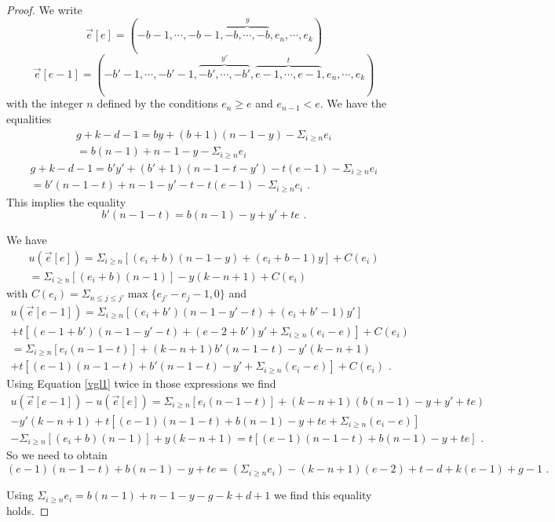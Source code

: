 \documentclass[10pt,a4paper]{amsart}
\begin{document}
\begin{proof}
We write
\[
\overrightarrow {e}[e]=(-b-1, \cdots , -b-1, \overbrace{-b, \cdots ,-b}^y,e_n, \cdots , e_k)
\]
\[
\overrightarrow {e}[e-1]=(-b'-1, \cdots , -b'-1, \overbrace {-b', \cdots , -b'}^{y' }, \overbrace {e-1, \cdots , e-1}^t, e_n , \cdots , e_k)
\]
with the integer $n$ defined by the conditions $e_n \geq e$ and $e_{n-1} <e$.
We have the equalities
\begin{multline*}
g+k-d-1=by+(b+1)(n-1-y)-\Sigma_{i \geq n}e_i \\
= b(n-1)+n-1-y-\Sigma_{i \geq n}e_i
\end{multline*}
\begin{multline*}
g+k-d-1=b'y'+(b'+1)(n-1-t-y')-t(e-1)-\Sigma _{i \geq n}e_i\\
=b'(n-1-t)+n-1-y'-t-t(e-1)-\Sigma _{i \geq n}e_i \text { .}
\end{multline*}
This implies the equality
\begin{equation}\label{vgl1}
b'(n-1-t)=b(n-1)-y+y'+te \text { .}
\end{equation}

We have
\begin{multline*}
u(\overrightarrow {e}[e])=\Sigma _{i \geq n} [(e_i+b)(n-1-y)+(e_i+b-1)y]+C(e_i)\\
=\Sigma _{i \geq n} [(e_i+b)(n-1)]-y(k-n+1)+C(e_i)
\end{multline*}
with $C(e_i)=\Sigma _{n \leq j \leq j'} \max \{ e_{j'}-e_j-1, 0 \}$ and
\begin{multline*}
u(\overrightarrow{e}[e-1])=\Sigma _{i \geq n}[(e_i+b')(n-1-y'-t)+(e_i+b'-1)y']\\
+t[(e-1+b')(n-1-y'-t)+(e-2+b')y'+\Sigma _{i \geq n}(e_i-e)]+C(e_i)\\
=\Sigma _{i \geq n} [e_i(n-1-t)]+(k-n+1)b'(n-1-t)-y'(k-n+1)\\
+t[(e-1)(n-1-t)+b'(n-1-t)-y'+\Sigma _{i \geq n} (e_i-e)]+C(e_i) \text {  .}
\end{multline*}
Using Equation \ref{vgl1} twice in those expressions we find
\begin{multline*}
u(\overrightarrow {e}[e-1])-u(\overrightarrow{e}[e])=\Sigma_{i \geq n}[e_i(n-1-t)]+(k-n+1)(b(n-1)-y+y'+te)\\
-y'(k-n+1)+t[(e-1)(n-1-t)+b(n-1)-y+te+\Sigma _{i \geq n} (e_i-e)]\\
-\Sigma_{i \geq n}[(e_i+b)(n-1)]+y(k-n+1)=t[(e-1)(n-1-t)+b(n-1)-y+te] \text { .}
\end{multline*}
So we need to obtain
\[
(e-1)(n-1-t)+b(n-1)-y+te=(\Sigma _{i \geq n}e_i)-(k-n+1)(e-2)+t-d+k(e-1)+g-1 \text { .}
\]

Using $\Sigma _{i\geq n} e_i=b(n-1)+n-1-y-g-k+d+1$ we find this equality holds.
\end{proof}
\end{document}
